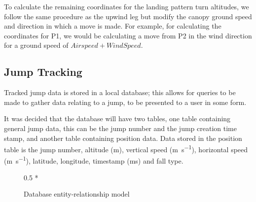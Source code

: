 To calculate the remaining coordinates for the landing pattern turn altitudes, we follow the same procedure as the upwind leg but modify the canopy ground speed and direction in which a move is made. For example, for calculating the coordinates for P1, we would be calculating a move from P2 in the wind direction for a ground speed of $Airspeed + WindSpeed$.

\subsection{Jump Tracking}
Tracked jump data is stored in a local database; this allows for queries to be made to gather data relating to a jump, to be presented to a user in some form.

It was decided that the database will have two tables, one table containing general jump data, this can be the jump number and the jump creation time stamp, and another table containing position data. Data stored in the position table is the jump number, altitude (\si{\metre}), vertical speed (\si{\metre\per\second}), horizontal speed (\si{\metre\per\second}), latitude, longitude, timestamp (\si{\milli\second}) and fall type.

\begin{figure}[ht]
  \centering
  \begin{scaletikzpicturetowidth}{0.5 * \linewidth}
  \end{scaletikzpicturetowidth}
  \caption{Database entity-relationship model}\label{fig:database-relations}
\end{figure}

